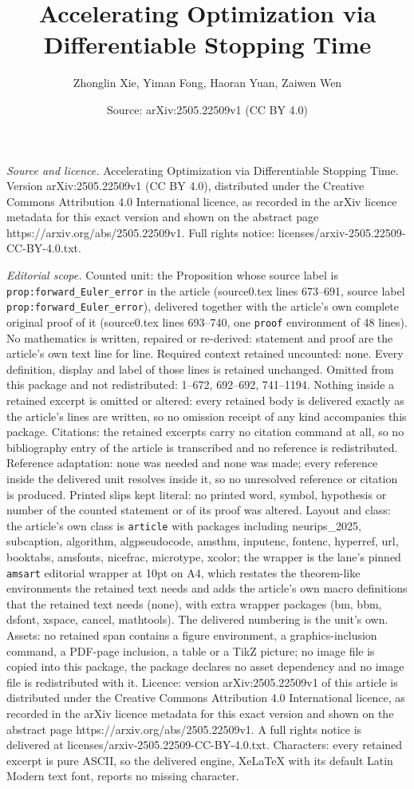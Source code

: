 \documentclass[10pt,a4paper]{amsart}
\title[Accelerating Optimization via Differentiable Stopping Time]{Accelerating Optimization via Differentiable Stopping Time}
\author{Zhonglin Xie, Yiman Fong, Haoran Yuan, Zaiwen Wen}
\date{Source: arXiv:2505.22509v1 (CC BY 4.0)}
\begin{document}
\maketitle

\noindent\emph{Source and licence.} Accelerating Optimization via Differentiable Stopping Time. Version arXiv:2505.22509v1 (CC BY 4.0), distributed under the Creative Commons Attribution 4.0 International licence, as recorded in the arXiv licence metadata for this exact version and shown on the abstract page https://arxiv.org/abs/2505.22509v1. Full rights notice: licenses/arxiv-2505.22509-CC-BY-4.0.txt.\par\smallskip

\noindent\textit{Editorial scope.} Counted unit: the Proposition whose source label is \texttt{prop:forward\_Euler\_error} in the article (source0.tex lines 673--691, source label \texttt{prop:forward\_Euler\_error}), delivered together with the article's own complete original proof of it (source0.tex lines 693--740, one \texttt{proof} environment of 48 lines). No mathematics is written, repaired or re-derived: statement and proof are the article's own text line for line. Required context retained uncounted: none. Every definition, display and label of those lines is retained unchanged. Omitted from this package and not redistributed: 1--672, 692--692, 741--1194. Nothing inside a retained excerpt is omitted or altered: every retained body is delivered exactly as the article's lines are written, so no omission receipt of any kind accompanies this package. Citations: the retained excerpts carry no citation command at all, so no bibliography entry of the article is transcribed and no reference is redistributed. Reference adaptation: none was needed and none was made; every reference inside the delivered unit resolves inside it, so no unresolved reference or citation is produced. Printed slips kept literal: no printed word, symbol, hypothesis or number of the counted statement or of its proof was altered. Layout and class: the article's own class is \texttt{article} with packages including neurips\_2025, subcaption, algorithm, algpseudocode, amsthm, inputenc, fontenc, hyperref, url, booktabs, amsfonts, nicefrac, microtype, xcolor; the wrapper is the lane's pinned \texttt{amsart} editorial wrapper at 10pt on A4, which restates the theorem-like environments the retained text needs and adds the article's own macro definitions that the retained text needs (none), with extra wrapper packages (bm, bbm, dsfont, xspace, cancel, mathtools). The delivered numbering is the unit's own. Assets: no retained span contains a figure environment, a graphics-inclusion command, a PDF-page inclusion, a table or a TikZ picture; no image file is copied into this package, the package declares no asset dependency and no image file is redistributed with it. Licence: version arXiv:2505.22509v1 of this article is distributed under the Creative Commons Attribution 4.0 International licence, as recorded in the arXiv licence metadata for this exact version and shown on the abstract page https://arxiv.org/abs/2505.22509v1. A full rights notice is delivered at licenses/arxiv-2505.22509-CC-BY-4.0.txt. Characters: every retained excerpt is pure ASCII, so the delivered engine, XeLaTeX with its default Latin Modern text font, reports no missing character.
\end{document}
